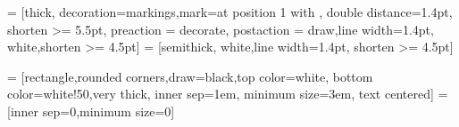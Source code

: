 \usepackage{tikz}
\usetikzlibrary{arrows}
\usetikzlibrary{arrows, decorations.markings}



 = [thick, decoration={markings,mark=at position
   1 with {}},
   double distance=1.4pt, shorten >= 5.5pt,
   preaction = {decorate},
   postaction = {draw,line width=1.4pt, white,shorten >= 4.5pt}]
 = [semithick, white,line width=1.4pt, shorten >= 4.5pt]




 = [rectangle,rounded corners,draw=black,top color=white, bottom color=white!50,very thick, inner sep=1em, minimum size=3em, text centered]
 = [inner sep=0,minimum size=0]

